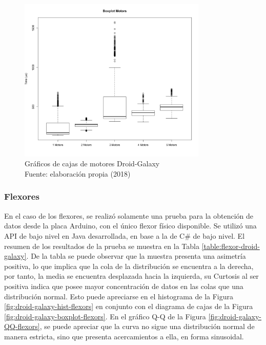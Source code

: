 \begin{figure}[H]
  \begin{center} 
   	\includegraphics[width=0.8\textwidth]{evaluation/graphics/Droid/Galaxy/BoxplotMotorsDroidGalaxy.png} 
    \caption[Gráficos de cajas de motores Droid-Galaxy]{Gráficos de cajas de motores Droid-Galaxy\\Fuente: elaboración propia (2018)} 
    \label{fig:droid-galaxy-boxplot-motors}
  \end{center}
\end{figure}



\subsubsection{Flexores}
En el caso de los flexores, se realizó solamente una prueba para la obtención de datos desde la placa Arduino, con el único flexor físico disponible. Se utilizó una API de bajo nivel en Java desarrollada, en base a la de C\# de bajo nivel. El resumen de los resultados de la prueba se muestra en la Tabla \ref{table:flexor-droid-galaxy}. De la tabla se puede observar que la muestra presenta una asimetría positiva, lo que implica que la cola de la distribución se encuentra a la derecha, por tanto, la media se encuentra desplazada hacia la izquierda, su Curtosis al ser positiva indica que posee mayor concentración de datos en las colas que una distribución normal. Esto puede apreciarse en el histograma de la Figura \ref{fig:droid-galaxy-hist-flexors} en conjunto con el diagrama de cajas de la Figura \ref{fig:droid-galaxy-boxplot-flexors}. En el gráfico Q-Q de la Figura \ref{fig:droid-galaxy-QQ-flexors}, se puede apreciar que la curva no sigue una distribución normal de manera estricta, sino que presenta acercamientos a ella, en forma sinusoidal.

